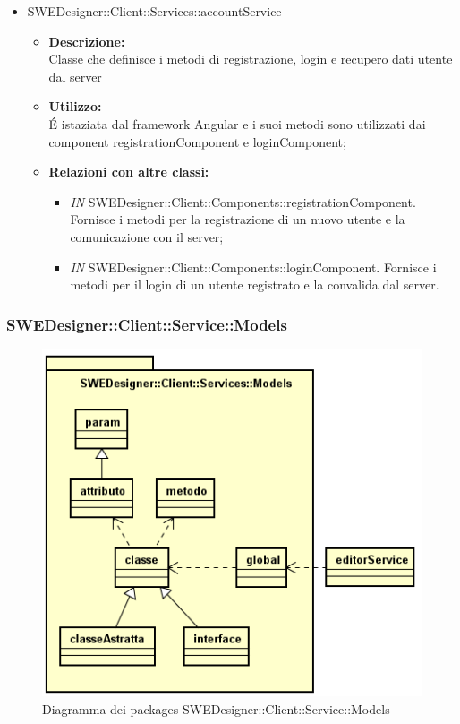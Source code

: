 \begin{itemize}
\begin{itemize}
		\item SWEDesigner::Client::Services::accountService
		\begin{itemize}
			\item \textbf{Descrizione:}\\
			Classe che definisce i metodi di registrazione, login e recupero dati utente dal server
			\item \textbf{Utilizzo:}\\
			É istaziata dal framework Angular e i suoi metodi sono utilizzati dai component registrationComponent e loginComponent;
			\item \textbf{Relazioni con altre classi: }
			\begin{itemize}
			\item \emph{IN}  SWEDesigner::Client::Components::registrationComponent. Fornisce i metodi per la registrazione di un nuovo utente e la comunicazione con il server;
			\item \emph{IN}  SWEDesigner::Client::Components::loginComponent. Fornisce i metodi per il login di un utente registrato e la convalida dal server.		
			\end{itemize}
		\end{itemize}
		
		\end{itemize}



\subsubsection{SWEDesigner::Client::Service::Models}
		 \begin{figure}[h!]
		\centering
		\includegraphics[scale=0.8]{Disegnetti/SWEDesigner__Client__Services__Model.png}
		\caption{Diagramma dei packages SWEDesigner::Client::Service::Models}
 		\end{figure}

\end{itemize}
